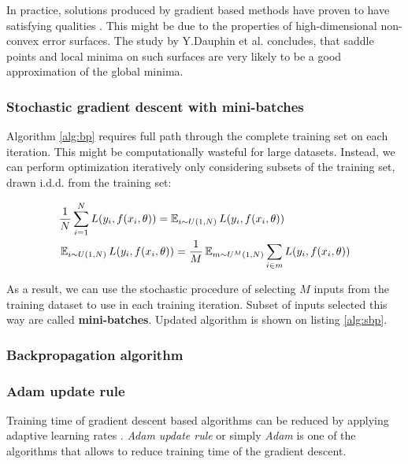In practice, solutions produced by gradient based methods have proven to have satisfying qualities \cite{Szegedy2016,He2015}.
This might be due to the properties of high-dimensional non-convex error surfaces. The study by Y.Dauphin et al. \cite{Dauphin14} concludes, that saddle points and local minima on such surfaces are very likely to be a good approximation of the global minima.

\subsubsection{Stochastic gradient descent with mini-batches}

Algorithm \ref{alg:bp} requires full path through the complete training set on each iteration.
This might be computationally wasteful for large datasets. Instead, we can perform optimization iteratively only considering subsets of the training set, drawn i.d.d. from the training set:

\begin{equation*}\label{eq:sopt}
  \begin{aligned}
  & \frac{1}{N} \sum_{i=1}^{N} L(y_i, f(x_i, \theta)) = \operatorname{\mathbb{E}}_{i \sim U(1,N) } L(y_i, f(x_i, \theta)) \\
  & \operatorname{\mathbb{E}}_{i \sim U(1,N) } L(y_i, f(x_i, \theta))= \frac{1}{M} \operatorname{\mathbb{E}}_{m \sim U^M(1,N) } \sum_{i \in m} L(y_i, f(x_i, \theta))
  \end{aligned}
\end{equation*}

As a result, we can use the stochastic procedure of selecting $M$ inputs from the training dataset to use in each training iteration.
Subset of inputs selected this way are called \textbf{mini-batches}. Updated algorithm is shown on listing \ref{alg:sbp}.



\subsubsection{Backpropagation algorithm}

\subsubsection{Adam update rule}

Training time of gradient descent based algorithms can be reduced by applying adaptive learning rates \cite{Kingma2015}.
\textit{Adam update rule} or simply \textit{Adam} is one of the algorithms that allows to reduce training time of the gradient descent.

